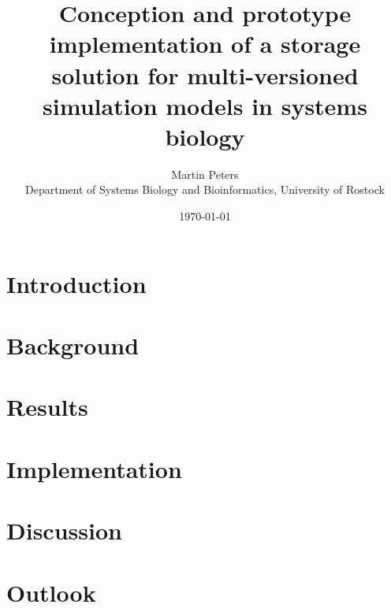 \documentclass[12pt, a4paper, titlepage]{book}
\title{Conception and prototype implementation of a storage solution for multi-versioned simulation models in systems biology}
\author{Martin Peters\\ \small Department of Systems Biology and Bioinformatics, University of Rostock}
\date{\today}
\begin{document}
	\maketitle
	\printindex
	
	\chapter{Introduction}
	
	
	\chapter{Background}
	
	
	\chapter{Results}
	
	
	\chapter{Implementation}
	
	
	\chapter{Discussion}
	
	
	\chapter{Outlook}
	
	
	
	
\end{document}
